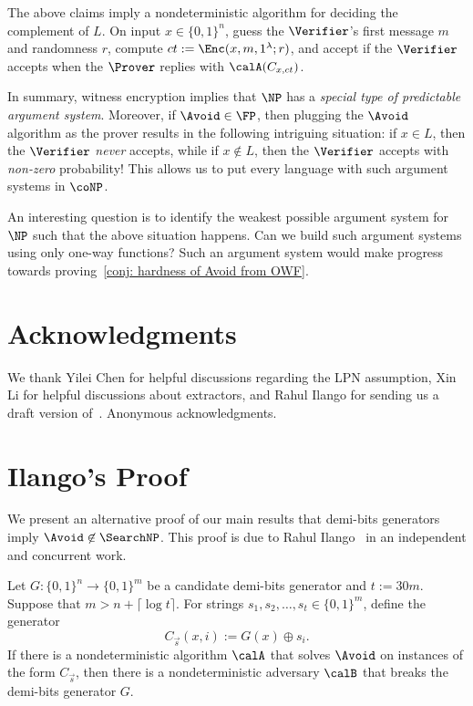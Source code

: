 The above claims imply a nondeterministic algorithm for deciding the complement of $L$. On input $x \in \{0, 1\}^n$, guess the $\Verifier$'s first message $m$ and randomness $r$, compute $ct := \Enc(x, m, 1^\lambda; r)$, and accept if the $\Verifier$ accepts when the $\Prover$ replies with $\calA(C_{x, ct})$.

In summary, witness encryption implies that $\NP$ has a \emph{special type of predictable argument system}. Moreover, if $\Avoid \in \FP$, then plugging the $\Avoid$ algorithm as the prover results in the following intriguing situation: if $x\in L$, then the $\Verifier$ \emph{never} accepts, while if $x\not\in L$, then the $\Verifier$ accepts with \emph{non-zero} probability! This allows us to put every language with such argument systems in $\coNP$.

An interesting question is to identify the weakest possible argument system for $\NP$ such that the above situation happens. Can we build such argument systems using only one-way functions? Such an argument system would make progress towards proving~\autoref{conj: hardness of Avoid from OWF}.







\section*{Acknowledgments}
\ifnum{}
We thank Yilei Chen for helpful discussions regarding the LPN assumption, Xin Li for helpful discussions about extractors, and Rahul Ilango for sending us a draft version of~\cite{Ilango25}.
\else
Anonymous acknowledgments.
\fi



\appendix

\section{Ilango's Proof}\label{sec: RAHUL}
We present an alternative proof of our main results that demi-bits generators imply $\Avoid\not\in\SearchNP$. This proof is due to Rahul Ilango~\cite{Ilango25} in an independent and concurrent work.


\begin{theorem}\label{thm: Ilango25}
    Let $G: \{0, 1\}^n \to \{0, 1\}^m$ be a candidate demi-bits generator and $t := 30m$. Suppose that $m > n + \lceil \log t\rceil$. For strings $s_1, s_2, \dots, s_t\in \{0, 1\}^m$, define the generator
    \[C_{\vec{s}}(x, i) := G(x) \oplus s_i.\]
    If there is a nondeterministic algorithm $\calA$ that solves $\Avoid$ on instances of the form $C_{\vec{s}}$, then there is a nondeterministic adversary $\calB$ that breaks the demi-bits generator $G$.
\end{theorem}

